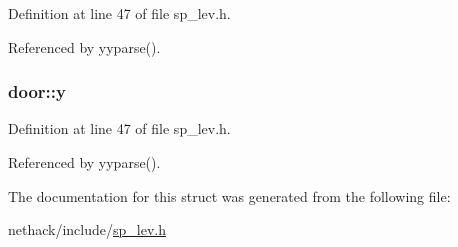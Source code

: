 Definition at line 47 of file sp\+\_\+lev.\+h.



Referenced by yyparse().

\hypertarget{structdoor_a18ca4d1d65808a6121566e988f846e61}{
\subsubsection[{y}]{ door\+::y}}\label{structdoor_a18ca4d1d65808a6121566e988f846e61}


Definition at line 47 of file sp\+\_\+lev.\+h.



Referenced by yyparse().



The documentation for this struct was generated from the following file\+:\begin{DoxyCompactItemize}
\item 
nethack/include/\hyperlink{sp__lev_8h}{sp\+\_\+lev.\+h}\end{DoxyCompactItemize}
